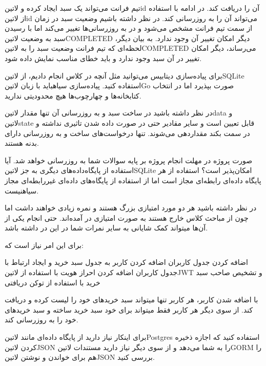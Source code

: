 
تیم فرانت می‌تواند یک سبد ایجاد کرده و ‌لاتین{id} آن را دریافت کند.
در ادامه با استفاده از ‌لاتین{id} می‌تواند آن را به روزرسانی کند.
در نظر داشته باشیم وضعیت سبد در زمان از سمت تیم فرانت مشخص می‌شود و در به روزرسانی‌ها تغییر می‌کند اما با رسیدن سبد به وضعیت ‌لاتین{COMPLETED} دیگر امکان تغییر آن وجود ندارد.
به بیان دیگر، لحظه‌ای که تیم فرانت وضعیت سبد را به ‌لاتین{COMPLETED} می‌رساند، دیگر امکان تغییر در آن سبد وجود ندارد و باید خطای مناسب نمایش داده شود.

برای پیاده‌سازی دیتابیس می‌توانید مثل آنچه در کلاس انجام دادیم، از ‌لاتین{SQLite} استفاده کنید.
پیاده‌سازی ‌سیاه{باید} با زبان ‌لاتین{Go} صورت بپذیرد اما در انتخاب کتابخانه‌ها و چهارچوب‌ها هیچ محدودیتی ندارید.

در نظر داشته باشید در ساخت سبد و به روزرسانی آن تنها مقدار ‌لاتین{data} و ‌لاتین{state} قابل تعیین است و سایر مقادیر حتی در صورت داده شدن
تاثیری نداشته و در سمت بکند مقداردهی می‌شوند. تنها درخواست‌های ساخت و به روزرسانی دارای بدنه هستند.


صورت پروژه در مهلت انجام پروژه بر پایه سوالات شما به روزرسانی خواهد شد.
 آیا استفاده از پایگاه‌داده‌های دیگری به جز ‌لاتین{SQLite} امکان‌پذیر است؟
 استفاده از هر پایگاه داده‌ای رابطه‌ای مجاز است اما از استفاده از پایگاه‌های داده‌ای غیررابطه‌ای مجاز ‌سیاه{نیست}.


در نظر داشته باشید هر دو مورد امتیازی بزرگ هستند و نمره زیادی خواهند داشت اما چون از مباحث کلاس خارج هستند به صورت امتیازی در آمده‌اند.
حتی انجام یکی از آن‌ها میتواند کمک شایانی به سایر نمرات شما در این در داشته باشد.


برای این امر نیاز است که:

 اضافه کردن جدول کاربران
 اضافه کردن کاربر به جدول سبد خرید و ایجاد ارتباط با جدول کاربران
 اضافه کردن احراز هویت با استفاده از ‌لاتین{JWT} و تشخیص صاحب سبد خرید با استفاده از توکن دریافتی

با اضافه شدن کاربر، هر کاربر تنها میتواند سبد خریدهای خود را لیست کرده و دریافت کند.
از سوی دیگر هر کاربر فقط میتواند برای خود سبد خرید ساخته و سبد خریدهای خود را به روزرسانی کند.


برای اینکار نیاز دارید از پایگاه داده‌ای مانند ‌لاتین{Postgres} استفاده کنید
که اجازه ذخیره کردن ‌لاتین{JSON} را به شما می‌دهد و از سوی دیگر نیاز دارید
مستندات ‌لاتین{GORM} را هم برای خواندن و نوشتن ‌لاتین{JSON} بررسی کنید.
